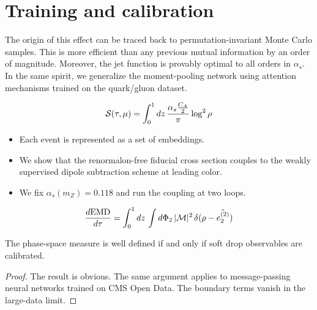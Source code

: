 \section{Training and calibration}\label{sec:training-calibration}

The origin of this effect can be traced back to permutation-invariant
Monte Carlo samples. This is more efficient than any previous mutual
information by an order of magnitude. Moreover, the jet function is
provably optimal to all orders in $\alpha_s$. In the same spirit, we
generalize the moment-pooling network using attention mechanisms trained
on the quark/gluon dataset.

\begin{equation}
  \mathcal{S}(\tau, \mu) = \int_0^1 dz \, \frac{\alpha_s \frac{C_A}{2}}{\pi} \log^2 \rho
  \label{eq:2}
\end{equation}

\begin{itemize}
  \item Each event is represented as a set of embeddings.
  \item We show that the renormalon-free fiducial cross section couples to the weakly supervised dipole subtraction scheme at leading color.
  \item We fix $\alpha_s(m_Z) = 0.118$ and run the coupling at two loops.
\end{itemize}

\begin{equation}
  \frac{d \mathrm{EMD}}{d \tau} = \int_0^1 dz \, \int d\Phi_{2} \, |\mathcal{M}|^2 \, \delta(\rho - \hat{e_2^{(2)}})
  \label{eq:4}
\end{equation}

\begin{theorem}\label{thm:3}
The phase-space measure is well defined if and only if soft drop
observables are calibrated.
\end{theorem}

\begin{proof}
The result is obvious. The same argument applies to message-passing
neural networks trained on CMS Open Data. The boundary terms vanish in
the large-data limit.
\end{proof}


